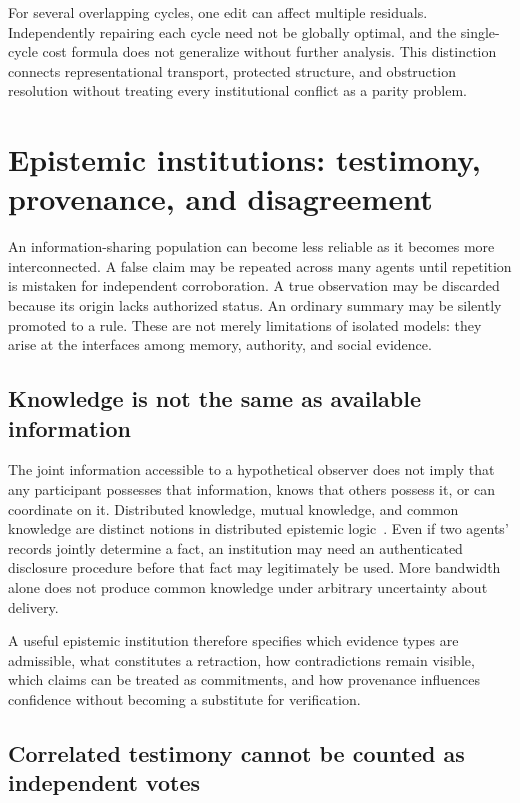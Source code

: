 For several overlapping cycles, one edit can affect multiple residuals. Independently repairing each cycle need not be globally optimal, and the single-cycle cost formula does not generalize without further analysis. This distinction connects representational transport, protected structure, and obstruction resolution without treating every institutional conflict as a parity problem.

\section{Epistemic institutions: testimony, provenance, and disagreement}\label{MS:sec:epistemic}

An information-sharing population can become less reliable as it becomes more interconnected. A false claim may be repeated across many agents until repetition is mistaken for independent corroboration. A true observation may be discarded because its origin lacks authorized status. An ordinary summary may be silently promoted to a rule. These are not merely limitations of isolated models: they arise at the interfaces among memory, authority, and social evidence.

\subsection{Knowledge is not the same as available information}

The joint information accessible to a hypothetical observer does not imply that any participant possesses that information, knows that others possess it, or can coordinate on it. Distributed knowledge, mutual knowledge, and common knowledge are distinct notions in distributed epistemic logic~\cite{MS:halpernmoses}. Even if two agents' records jointly determine a fact, an institution may need an authenticated disclosure procedure before that fact may legitimately be used. More bandwidth alone does not produce common knowledge under arbitrary uncertainty about delivery.

A useful epistemic institution therefore specifies which evidence types are admissible, what constitutes a retraction, how contradictions remain visible, which claims can be treated as commitments, and how provenance influences confidence without becoming a substitute for verification.

\subsection{Correlated testimony cannot be counted as independent votes}

